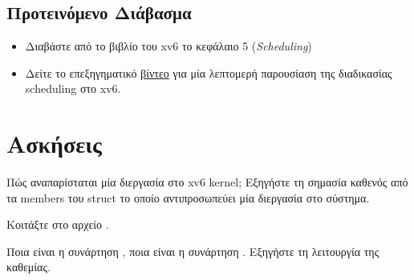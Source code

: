 \documentclass[18pt]{extarticle}
\begin{document}
\subsection{Προτεινόμενο Διάβασμα}

\begin{itemize}

    \item Διαβάστε από το βιβλίο του xv6 \cite{xv6Book} το κεφάλαιο 5 (\textit{Scheduling})
    \item Δείτε το επεξηγηματικό \href{https://www.youtube.com/watch?v=-O_JX5mMMHY}{βίντεο} για μία λεπτομερή παρουσίαση της διαδικασίας scheduling στο xv6.

\end{itemize}

\section{Ασκήσεις}

\begin{question}
    Πώς αναπαρίσταται μία διεργασία στο xv6 kernel;
    Εξηγήστε τη σημασία καθενός από τα members του struct 
    το οποίο αντιπροσωπεύει μία διεργασία στο σύστημα.

    \begin{info}[Σημείωση:]
        Κοιτάξτε στο αρχείο .
    \end{info}
\end{question}

\begin{question}
    Ποια είναι η συνάρτηση , ποια είναι η συνάρτηση . Εξηγήστε τη λειτουργία της καθεμίας.
\end{question}
\end{document}
